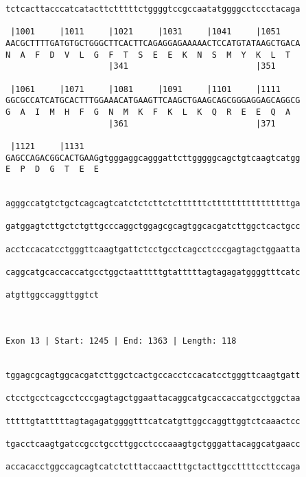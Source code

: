 \documentclass{article}
\begin{document}
\begin{Verbatim}
tctcacttacccatcatacttctttttctggggtccgccaatatggggcctccctacaga
                                                            
 |1001     |1011     |1021     |1031     |1041     |1051    
AACGCTTTTGATGTGCTGGGCTTCACTTCAGAGGAGAAAAACTCCATGTATAAGCTGACA
N  A  F  D  V  L  G  F  T  S  E  E  K  N  S  M  Y  K  L  T  
                     |341                          |351     
  
 |1061     |1071     |1081     |1091     |1101     |1111    
GGCGCCATCATGCACTTTGGAAACATGAAGTTCAAGCTGAAGCAGCGGGAGGAGCAGGCG
G  A  I  M  H  F  G  N  M  K  F  K  L  K  Q  R  E  E  Q  A  
                     |361                          |371     
  
 |1121     |1131                                            
GAGCCAGACGGCACTGAAGgtgggaggcagggattcttgggggcagctgtcaagtcatgg
E  P  D  G  T  E  E                                         
                                                            
  
agggccatgtctgctcagcagtcatctctcttctcttttttcttttttttttttttttga
                                                            
gatggagtcttgctctgttgcccaggctggagcgcagtggcacgatcttggctcactgcc
                                                            
acctccacatcctgggttcaagtgattctcctgcctcagcctcccgagtagctggaatta
                                                            
caggcatgcaccaccatgcctggctaatttttgtatttttagtagagatggggtttcatc
                                                            
atgttggccaggttggtct
                   
                   
 
Exon 13 | Start: 1245 | End: 1363 | Length: 118


tggagcgcagtggcacgatcttggctcactgccacctccacatcctgggttcaagtgatt
                                                            
ctcctgcctcagcctcccgagtagctggaattacaggcatgcaccaccatgcctggctaa
                                                            
tttttgtatttttagtagagatggggtttcatcatgttggccaggttggtctcaaactcc
                                                            
tgacctcaagtgatccgcctgccttggcctcccaaagtgctgggattacaggcatgaacc
                                                            
accacacctggccagcagtcatctctttaccaactttgctacttgccttttccttccaga
                                                            

\end{Verbatim}
\end{document}
